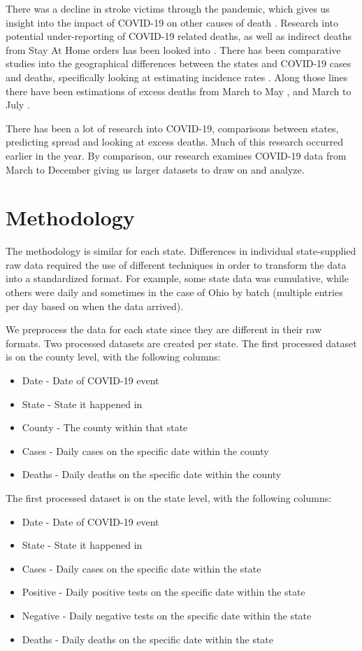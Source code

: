 \documentclass[conference]{IEEEtran}
\begin{document}
There was a decline in stroke victims through the pandemic, which gives us insight into the impact of COVID-19 on other causes of death \cite{uchino_decline_2020}.
Research into potential under-reporting of COVID-19 related deaths, as well as indirect deaths from Stay At Home orders has been looked into \cite{woolf_excess_2020}.
There has been comparative studies into the geographical differences between the states and COVID-19 cases and deaths, specifically looking at estimating incidence rates \cite{cdc_covid-19_response_team_geographic_2020}. 
Along those lines there have been estimations of excess deaths from March to May \cite{weinberger_estimation_2020}, and March to July \cite{woolf_excess_2020-1}.

There has been a lot of research into COVID-19, comparisons between states, predicting spread and looking at excess deaths. 
Much of this research occurred earlier in the year. By comparison, our research examines COVID-19 data from March to December giving us larger datasets to draw on and analyze.

\section{Methodology}

The methodology is similar for each state. Differences in individual state-supplied raw data required the use of different techniques in order to transform the data into a standardized format.
For example, some state data was cumulative, while others were daily and sometimes in the case of Ohio by batch (multiple entries per day based on when the data arrived).

We preprocess the data for each state since they are different in their raw formats.
Two processed datasets are created per state.
The first processed dataset is on the county level, with the following columns:
\begin{itemize}
  \item Date - Date of COVID-19 event
  \item State - State it happened in
  \item County - The county within that state
  \item Cases - Daily cases on the specific date within the county
  \item Deaths - Daily deaths on the specific date within the county
\end{itemize}

The first processed dataset is on the state level, with the following columns:
\begin{itemize}
  \item Date - Date of COVID-19 event
  \item State - State it happened in
  \item Cases - Daily cases on the specific date within the state
  \item Positive - Daily positive tests on the specific date within the state
  \item Negative - Daily negative tests on the specific date within the state
  \item Deaths - Daily deaths on the specific date within the state
\end{itemize}
\end{document}
